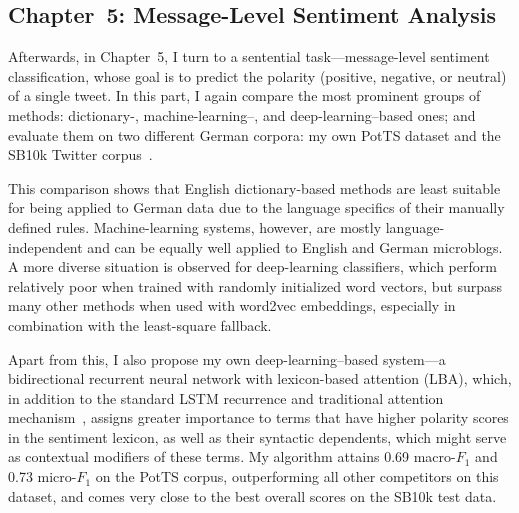 \documentclass[11pt]{article}
\newcommand{\F}[0]{$F_1$}
\renewcommand{\cite}{\citep}
\begin{document}

\subsection{Chapter~5: Message-Level Sentiment Analysis}

Afterwards, in Chapter~5, I turn to a sentential task---message-level
sentiment classification, whose goal is to predict the polarity
(positive, negative, or neutral) of a single tweet.  In this part, I
again compare the most prominent groups of methods: dictionary-,
machine-learning--, and deep-learning--based ones; and evaluate them
on two different German corpora: my own PotTS dataset and the SB10k
Twitter corpus~\cite{Cieliebak:17}.

This comparison shows that English dictionary-based methods are least
suitable for being applied to German data due to the language
specifics of their manually defined rules.  Machine-learning systems,
however, are mostly language-independent and can be equally well
applied to English and German microblogs.  A more diverse situation is
observed for deep-learning classifiers, which perform relatively poor
when trained with randomly initialized word vectors, but surpass many
other methods when used with word2vec embeddings, especially in
combination with the least-square fallback.

Apart from this, I also propose my own deep-learning--based system---a
bidirectional recurrent neural network with lexicon-based attention
(LBA), which, in addition to the standard LSTM recurrence and
traditional attention mechanism~\cite{Bahdanau:14}, assigns greater
importance to terms that have higher polarity scores in the sentiment
lexicon, as well as their syntactic dependents, which might serve as
contextual modifiers of these terms.  My algorithm attains 0.69
macro-\F{} and 0.73 micro-\F{} on the PotTS corpus, outperforming all
other competitors on this dataset, and comes very close to the best
overall scores on the SB10k test data.
\end{document}
